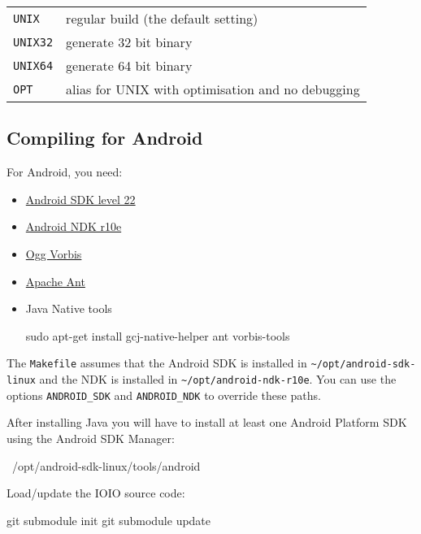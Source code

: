 \begin{tabular}{lp{8cm}}

\texttt{UNIX} & regular build (the default setting) \\

\texttt{UNIX32} & generate 32 bit binary \\

\texttt{UNIX64} & generate 64 bit binary \\

\texttt{OPT} & alias for UNIX with optimisation and no debugging \\

\end{tabular}

\subsection{Compiling for Android}

For Android, you need:

\begin{itemize}
\item \href{http://developer.android.com/sdk/}{Android SDK level 22}
\item \href{http://developer.android.com/sdk/ndk/}{Android NDK r10e}
\item \href{http://www.vorbis.com/}{Ogg Vorbis}
\item \href{http://ant.apache.org/}{Apache Ant}
\item {Java Native tools 
\begin{verbatim*}
sudo apt-get install gcj-native-helper ant vorbis-tools
\end{verbatim*}}
\end{itemize}

The \texttt{Makefile} assumes that the Android SDK is installed in
\verb|~/opt/android-sdk-linux| and the NDK is installed in
\verb|~/opt/android-ndk-r10e|.  You can use the options
\verb|ANDROID_SDK| and \verb|ANDROID_NDK| to override these paths.

After installing Java you will have to install at least one Android Platform SDK using the Android SDK Manager:

\begin{verbatim*}
~/opt/android-sdk-linux/tools/android
\end{verbatim*}

Load/update the IOIO source code:

\begin{verbatim*}
git submodule init
git submodule update
\end{verbatim*}


